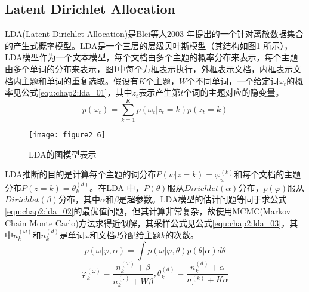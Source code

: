 \subsection{Latent Dirichlet Allocation}
LDA(Latent Dirichlet Allocation)是Blei等人2003 年提出的一个针对离散数据集合的产生式概率模型。LDA是一个三层的层级贝叶斯模型（其结构如图\ref{fig:2_6} 所示）， LDA模型作为一个文本模型，每个文档由多个主题的概率分布来表示，每个主题由多个单词的分布来表示，图\ref{fig:2_6}中每个方框表示执行，外框表示文档，内框表示文档内主题和单词的重复选取。假设有$K$个主题，$W$个不同单词，一个给定词$\omega_{t}$的概率见公式\ref{equ:chap2:lda_01}，其中$z_{t}$表示产生第$t$个词的主题对应的隐变量。
\begin{equation}
\label{equ:chap2:lda_01}
p(\omega_{t})=\sum_{k=1}^{K}p(\omega_t|z_{t}=k)p(z_{t}=k)
\end{equation}
\begin{figure}[htp]
\centering
\texttt{[image: figure2\_6]}
\caption{LDA的图模型表示}
\label{fig:2_6}
\end{figure}
\par LDA推断的目的是计算每个主题的词分布$P(w|z=k)=\varphi_{w}^{(k)}$和每个文档的主题分布$P(z=k)=\theta_{k}^{(d)}$。在LDA 中，$P(\theta)$服从$Dirichlet(\alpha)$分布，$p(\varphi)$服从$Dirichlet(\beta)$分布，其中$\alpha$和$\beta$是超参数。LDA模型的估计问题等同于求公式\ref{equ:chap2:lda_02}的最优值问题，但其计算非常复杂，故使用MCMC(Markov Chain Monte Carlo)方法求得近似解，其采样公式见公式\ref{equ:chap2:lda_03}，其中$n_{k}^{(\omega)}$和$n_{k}^{(d)}$是单词$\omega$和文档$d$分配给主题$k$的次数。
\begin{equation}
\label{equ:chap2:lda_02}
p(\omega|\varphi,\alpha)=\int p(\omega|\varphi,\theta)p(\theta|\alpha)d\theta
\end{equation}
\begin{equation}
\label{equ:chap2:lda_03}
\varphi_{k}^{(\omega)}=\frac{n_{k}^{(\omega)}+\beta}{n_{k}^{(.)}+W\beta},\theta_{k}^{(d)}=\frac{n_{k}^{(d)} + \alpha}{n_{.}^{(k)}+K\alpha}
\end{equation}
